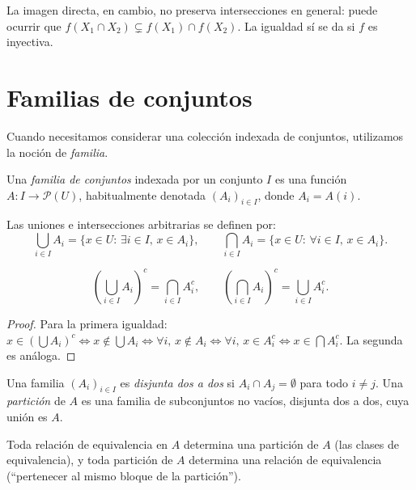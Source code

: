 \begin{remark}
La imagen directa, en cambio, no preserva intersecciones en general: puede ocurrir que $f(X_1\cap X_2)\subsetneq f(X_1)\cap f(X_2)$. La igualdad sí se da si $f$ es inyectiva.
\end{remark}

\section{Familias de conjuntos}

Cuando necesitamos considerar una colección indexada de conjuntos, utilizamos la noción de \emph{familia}.

\begin{definition}
\label{def:familia}
Una \emph{familia de conjuntos} indexada por un conjunto $I$ es una función $A\colon I\to\mathcal{P}(U)$, habitualmente denotada $(A_i)_{i\in I}$, donde $A_i=A(i)$.
\end{definition}

\begin{definition}
\label{def:union-interseccion-arbitraria}
Las uniones e intersecciones arbitrarias se definen por:
\[
  \bigcup_{i\in I} A_i=\{x\in U:\,\exists i\in I,\,x\in A_i\},\qquad
  \bigcap_{i\in I} A_i=\{x\in U:\,\forall i\in I,\,x\in A_i\}.
\]
\end{definition}

\begin{theorem}
\label{teo:demorgan-general}
\[
  \left(\bigcup_{i\in I} A_i\right)^c=\bigcap_{i\in I} A_i^c,\qquad
  \left(\bigcap_{i\in I} A_i\right)^c=\bigcup_{i\in I} A_i^c.
\]
\end{theorem}

\begin{proof}
Para la primera igualdad: $x\in(\bigcup A_i)^c\Leftrightarrow x\notin\bigcup A_i\Leftrightarrow\forall i,\,x\notin A_i\Leftrightarrow\forall i,\,x\in A_i^c\Leftrightarrow x\in\bigcap A_i^c$. La segunda es análoga.
\end{proof}

\begin{definition}
Una familia $(A_i)_{i\in I}$ es \emph{disjunta dos a dos} si $A_i\cap A_j=\emptyset$ para todo $i\neq j$. Una \emph{partición} de $A$ es una familia de subconjuntos no vacíos, disjunta dos a dos, cuya unión es $A$.
\end{definition}

\begin{proposition}
Toda relación de equivalencia en $A$ determina una partición de $A$ (las clases de equivalencia), y toda partición de $A$ determina una relación de equivalencia (``pertenecer al mismo bloque de la partición'').
\end{proposition}


